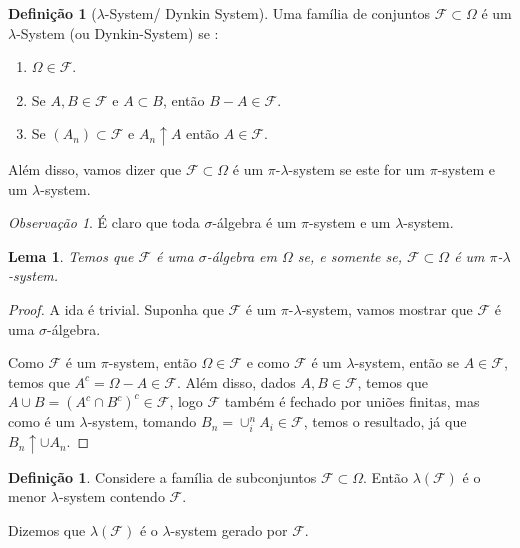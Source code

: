 \documentclass[12pt,a4paper,oneside]{book}
\newtheorem{lemma}[theorem]{Lema}
\theoremstyle{definition}
\newtheorem{definition}[theorem]{Defini\c{c}\~ao}
\theoremstyle{remark}
\newtheorem{remark}[theorem]{Observa\c{c}\~ao}
\numberwithin{equation}{section}
\begin{document}
\begin{definition}[$\lambda$-System/ Dynkin System]   Uma família de conjuntos $\mathcal{F}\subset \Omega$ é um $\lambda$-System  (ou Dynkin-System) se :
\begin{enumerate}
\item $\Omega\in \mathcal{F}$.
\item Se $A,B\in \mathcal{F}$ e $A\subset B$, então $B-A\in \mathcal{F}.$
\item Se $(A_n)\subset \mathcal{F}$ e  $A_n\uparrow A$ então $A\in \mathcal{F}.$
\end{enumerate}

Além disso, vamos dizer que $\mathcal{F}\subset \Omega$ é um $\pi$-$\lambda$-system se este for um $\pi$-system e um $\lambda$-system.
\end{definition}

\begin{remark}
É claro que toda $\sigma$-álgebra é um $\pi$-system e um $\lambda$-system.
\end{remark}

\begin{lemma}
Temos que $\mathcal{F}$ é uma $\sigma$-álgebra em $\Omega$ se, e somente  se, $\mathcal{F}\subset \Omega$ é um $\pi$-$\lambda$-system. 
\end{lemma}

\begin{proof}
A ida é trivial. Suponha que $\mathcal{F}$ é um $\pi$-$\lambda$-system, vamos mostrar que $\mathcal{F}$ é uma $\sigma$-álgebra.

Como $\mathcal{F}$ é um $\pi$-system, então $\Omega\in \mathcal{F}$ e como $\mathcal{F}$ é um $\lambda$-system, então se $A\in \mathcal{F}$, temos que $A^c = \Omega-A\in \mathcal{F} $. Além disso, dados $A,B\in \mathcal{F}$, temos que $A\cup B = (A^c\cap B^c)^c\in \mathcal{F}$, logo $\mathcal{F}$ também é fechado por uniões finitas, mas como é um $\lambda$-system, tomando $B_n = \cup^n_i A_i\in \mathcal{F}$, temos o resultado, já que $B_n\uparrow \cup A_n$.

\end{proof}

\begin{definition}
Considere a família de subconjuntos $\mathcal{F}\subset \Omega$. Então $\lambda(\mathcal{F})$ é o menor $\lambda$-system contendo $\mathcal{F}$. 

Dizemos que $\lambda(\mathcal{F})$ é o $\lambda$-system gerado por $\mathcal{F}$.
\end{definition}
\end{document}
